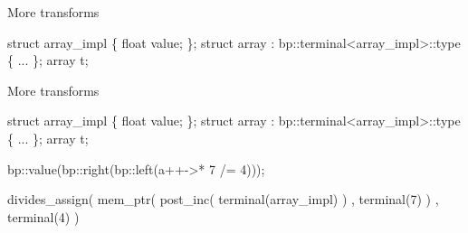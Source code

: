 
\begin{frame}[fragile]{More transforms}
\begin{semiverbatim}
struct array_impl \{ float value; \};
struct array : bp::terminal<array_impl>::type \{ ... \};
array t;












\end{semiverbatim}
\end{frame}


\begin{frame}[fragile]{More transforms}
\begin{semiverbatim}
struct array_impl \{ float value; \};
struct array : bp::terminal<array_impl>::type \{ ... \};
array t;

\alert<8>{bp::value(\alert<6>{bp::right(\alert<4>{bp::left(\alert<2>{\alert<5>{a++->* \alert<7,9>{7}} /= 4})})});}

\alert<3>{divides_assign(
\alert<5>{    mem_ptr(
        post_inc(
            terminal(array_impl)
        )
      , \alert<7>{terminal(\alert<9>{7})}
    )}
  , terminal(4)
)}
\end{semiverbatim}
\end{frame}



